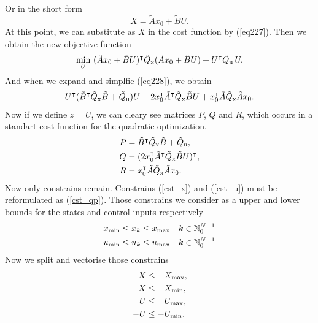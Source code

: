Or in the short form
\begin{equation}\label{eq227}
	X = \tilde{A}x_0 + \tilde{B}U.
\end{equation}
At this point, we can substitute as $X$ in the cost function by (\ref{eq227}). Then we obtain the new objective function
\begin{equation}\label{eq228}
	\min_{U}\ (\tilde{A}x_0 + \tilde{B}U)^\intercal\tilde{Q} _{\text{x}}(\tilde{A}x_0 + \tilde{B}U) + U^\intercal\tilde{Q} _{\text{u}}\,U.
\end{equation}
And when we expand and simplfie (\ref{eq228}), we obtain
\begin{equation}
	U^\intercal(\tilde{B}^\intercal\tilde{Q} _{\text{x}}\tilde{B} + \tilde{Q} _{\text{u}})U + 2x_0^\intercal\tilde{A}^\intercal\tilde{Q} _{\text{x}}\tilde{B}U + x_0^\intercal\tilde{A}\tilde{Q} _{\text{x}}\tilde{A}x_0.
\end{equation}
Now if we define $z = U$, we can cleary see matrices $P$, $Q$ and $R$, which occurs in a standart cost function for the quadratic optimization.
\begin{subequations}
	\begin{align}
		P &= \tilde{B}^\intercal\tilde{Q} _{\text{x}}\tilde{B} + \tilde{Q} _{\text{u}},\\
		Q &= (2x_0^\intercal\tilde{A}^\intercal\tilde{Q} _{\text{x}}\tilde{B}U)^\intercal,\\
		R &= x_0^\intercal\tilde{A}\tilde{Q} _{\text{x}}\tilde{A}x_0.
	\end{align}
\end{subequations}
Now only constrains remain. Constrains (\ref{cst_x}) and (\ref{cst_u}) must be reformulated as (\ref{cst_qp}). Those constrains we consider as a upper and lower bounds for the states and control inputs respectively
\begin{subequations}
	\begin{align}
		x _{\text{min}} &\leq x_k \leq x _{\text{max}} \quad k \in \mathbb{N}_0^{N-1}\\
		u _{\text{min}} &\leq u_k \leq u _{\text{max}} \quad k \in \mathbb{N}_0^{N-1}
	\end{align}
\end{subequations}
Now we split and vectorise those constrains
\begin{subequations}
\begin{align}
	X &\leq \ \; \, X _{\text{max}},\\
	-X &\leq -X _{\text{min}},\\
	U &\leq \ \; \, U _{\text{max}},\\
	-U &\leq -U _{\text{min}}.
\end{align}
\end{subequations}
